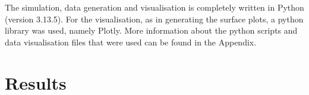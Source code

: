 \documentclass[11pt]{article}
\begin{document}
The simulation, data generation and visualisation is completely written in Python (version 3.13.5).
For the visualisation, as in generating the surface plots, a python library was used, namely Plotly.
More information about the python scripts and data visualisation files that were used can be found in the Appendix.

	


\section{Results} \label{sec:results}
\end{document}
